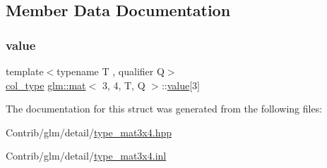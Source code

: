 \subsection{Member Data Documentation}
\mbox{\label{structglm_1_1mat_3_013_00_014_00_01_t_00_01_q_01_4_a5565dc4ee500797675a5841e79cf8d3c}} 
\subsubsection{\texorpdfstring{value}{value}}
{\footnotesize\ttfamily template$<$typename T , qualifier Q$>$ \\
\mbox{\hyperlink{structglm_1_1mat_3_013_00_014_00_01_t_00_01_q_01_4_aaa23c4674cbe2dc1eda1d826b8ef721e}{col\+\_\+type}} \mbox{\hyperlink{structglm_1_1mat}{glm\+::mat}}$<$ 3, 4, T, Q $>$\+::\mbox{\hyperlink{_s_d_l__opengl__glext_8h_a8ad81492d410ff2ac11f754f4042150f}{value}}\mbox{[}3\mbox{]}\hspace{0.3cm}{\ttfamily [private]}}



The documentation for this struct was generated from the following files\+:\begin{DoxyCompactItemize}
\item 
Contrib/glm/detail/\mbox{\hyperlink{type__mat3x4_8hpp}{type\+\_\+mat3x4.\+hpp}}\item 
Contrib/glm/detail/\mbox{\hyperlink{type__mat3x4_8inl}{type\+\_\+mat3x4.\+inl}}\end{DoxyCompactItemize}
